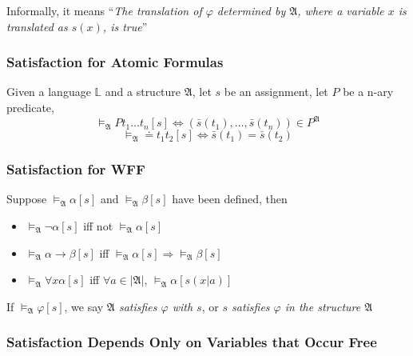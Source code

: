 Informally, it means ``\emph{The translation of $\varphi$ determined by $\mathfrak{A}$, where a variable $x$ is translated as $s(x)$, is true}''

\subsubsection{Satisfaction for Atomic Formulas}

\begin{definition}
    Given a language $\mathbb{L}$ and a structure $\mathfrak{A}$, let $s$ be an assignment, let $P$ be a n-ary predicate,
    \[ \vDash_{\mathfrak{A}} Pt_1\dots t_n[s] \Leftrightarrow (\bar{s}(t_1),\dots,\bar{s}(t_n)) \in P^{\mathfrak{A}} \]
    \[ \vDash_{\mathfrak{A}} \doteq t_1t_2[s] \Leftrightarrow \bar{s}(t_1) = \bar{s}(t_2) \]
\end{definition}

\subsubsection{Satisfaction for WFF}

\begin{definition}
    Suppose $\vDash_{\mathfrak{A}}\alpha[s]$ and $\vDash_{\mathfrak{A}}\beta[s]$ have been defined, then
    \begin{itemize}
        \item $\vDash_{\mathfrak{A}} \neg\alpha[s]$ iff not $\vDash_{\mathfrak{A}}\alpha[s]$
        \item $\vDash_{\mathfrak{A}}\alpha\to\beta[s]$ iff $\vDash_{\mathfrak{A}}\alpha[s]\Longrightarrow\vDash_{\mathfrak{A}}\beta[s]$
        \item $\vDash_{\mathfrak{A}}\forall x \alpha[s]$ iff $\forall a\in|\mathfrak{A}|$, $\vDash_{\mathfrak{A}}\alpha[s(x|a)]$
    \end{itemize}
\end{definition}

If $\vDash_{\mathfrak{A}}\varphi[s]$, we say \emph{$\mathfrak{A}$ satisfies $\varphi$ with $s$}, or \emph{$s$ satisfies $\varphi$ in the structure $\mathfrak{A}$}

\subsubsection{Satisfaction Depends Only on Variables that Occur Free}


